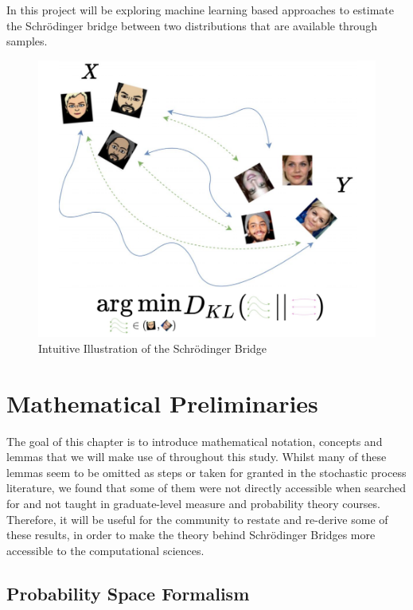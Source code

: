 \documentclass[a4paper,12pt,twoside,openright]{report}
\theoremstyle{definition}
\begin{document}
 In this project will be exploring machine learning based approaches to estimate the Schrödinger bridge between two distributions that are available through samples.
\begin{figure}
    \centering
    \includegraphics[scale=0.7]{images/charicaturistic_bridge.PNG}
    \caption{Intuitive Illustration of the Schrödinger Bridge}
    \label{fig:intuitive_bridge}
\end{figure}

 
\chapter{Mathematical Preliminaries}


The goal of this chapter is to introduce mathematical notation, concepts and lemmas that we will make use of throughout this study. Whilst many of these lemmas seem to be omitted as steps or taken for granted in the stochastic process literature, we found that some of them were not directly accessible when searched for and not taught in graduate-level measure and probability theory courses. Therefore, it will be useful for the community to restate and re-derive some of these results, in order to make the theory behind Schrödinger Bridges more accessible to the computational sciences.
\section{Probability Space Formalism}
\end{document}
